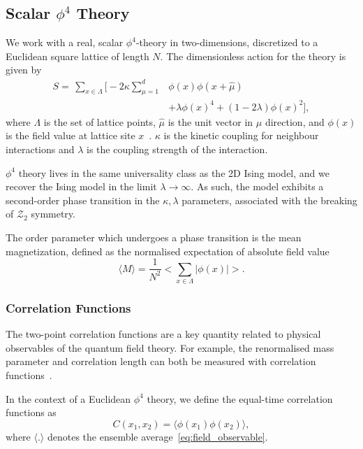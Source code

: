 \documentclass[11pt]{article}
\begin{document}
\subsection{Scalar $\phi^4$ Theory}\label{subsec:phi^4_theory}
    We work with a real, scalar $\phi^4$-theory in two-dimensions, discretized to a Euclidean square lattice of length $N$.
    The dimensionless action for the theory is given by
    \begin{equation}\label{eq:phi4_action}
    \begin{aligned}
        S = \,\sum\limits_{x \in \Lambda} \Biggl[-2\kappa \sum\limits_{\mu=1}^d & \phi(x) \phi(x+\hat{\mu}) \\
        &+\lambda \phi(x)^4 + (1 - 2\lambda) \phi(x)^2 \Biggr],
    \end{aligned}
    \end{equation}
    where $\Lambda$ is the set of lattice points, $\hat{\mu}$ is the unit vector in $\mu$ direction, and $\phi(x)$ is
    the field value at lattice site $x$~\cite{maas2020lattice}. $\kappa$ is the kinetic coupling for neighbour interactions and $\lambda$ is the
    coupling strength of the interaction.

    $\phi^4$ theory lives in the same universality class as the 2D Ising model, and we recover the Ising model
    in the limit $\lambda \rightarrow \infty$.
    As such, the model exhibits a second-order phase transition in the $\kappa, \lambda$ parameters, associated
    with the breaking of $\mathcal{Z}_2$ symmetry.

    The order parameter which undergoes a phase transition is the mean magnetization, defined as the normalised
    expectation of absolute field value
    \begin{equation}\label{eq:magnetization}
        \langle M \rangle = \frac{1}{N^2} \bigl< \sum_{x \in \Lambda} |\phi(x)| \bigr>.
    \end{equation}

    \subsubsection{Correlation Functions}
    The two-point correlation functions are a key quantity related to physical
    observables of the quantum field theory.
    For example, the renormalised mass parameter and correlation length can both be measured with correlation
    functions~\cite{maas2020lattice}.

    In the context of a Euclidean $\phi^4$ theory, we define the equal-time correlation functions as
    \begin{equation}\label{eq:full_correlation_function}
        C(x_1, x_2) = \langle \phi(x_1) \phi(x_2) \rangle,
    \end{equation}
    where $\langle . \rangle$ denotes the ensemble average~\ref{eq:field_observable}.
\end{document}
